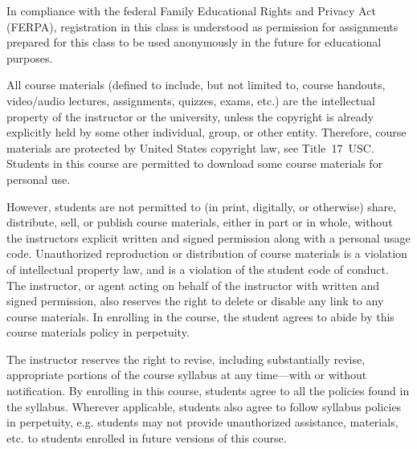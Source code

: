 \documentclass[11pt,letterpaper]{article}
\begin{document}

In compliance with the federal Family Educational Rights and Privacy Act (FERPA), registration in this class is understood as permission for assignments prepared for this class to be used anonymously in the future for educational purposes.
\sectionbreak




All course materials (defined to include, but not limited to, course handouts, video/audio lectures, assignments, quizzes, exams, etc.) are the intellectual property of the instructor or the university, unless the copyright is already explicitly held by some other individual, group, or other entity. Therefore, course materials are protected by United States copyright law, see Title~17~USC. Students in this course are permitted to download some course materials for personal use. \pspace

However, students are not permitted to (in print, digitally, or otherwise) share, distribute, sell, or publish course materials, either in part or in whole, without the instructors explicit written and signed permission along with a personal usage code. Unauthorized reproduction or distribution of course materials is a violation of intellectual property law, and is a violation of the student code of conduct. The instructor, or agent acting on behalf of the instructor with written and signed permission, also reserves the right to delete or disable any link to any course materials. In enrolling in the course, the student agrees to abide by this course materials policy in perpetuity.
\sectionbreak





\newpage






The instructor reserves the right to revise, including substantially revise, appropriate portions of the course syllabus at any time---with or without notification. By enrolling in this course, students agree to all the policies found in the syllabus. Wherever applicable, students also agree to follow syllabus policies in perpetuity, e.g. students may not provide unauthorized assistance, materials, etc. to students enrolled in future versions of this course. 
\sectionbreak
\end{document}
